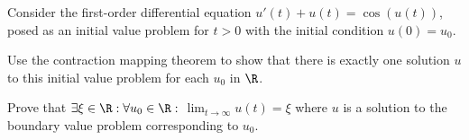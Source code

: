 Consider the first-order differential equation $u'(t)+u(t)=\cos(u(t))$,
posed as an initial value problem for $t>0$ with the initial
condition $u(0)=u_0$.
\begin{alist}
\item Use the contraction mapping theorem to show that there is 
exactly one solution $u$ to this initial value problem for each $u_0$
in $\R$.
\item Prove that $\exists \xi\in \R:\forall u_0\in \R:$
$\lim_{t\rightarrow \infty}u(t)=\xi$ where $u$ is a solution to the
boundary value problem corresponding to $u_0$.
\end{alist}
